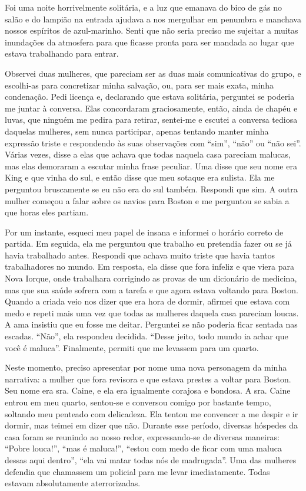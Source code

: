 Foi uma noite horrivelmente solitária, e a luz que emanava do bico de
gás no salão e do lampião na entrada ajudava a nos mergulhar em penumbra
e manchava nossos espíritos de azul-marinho. Senti que não seria preciso
me sujeitar a muitas inundações da atmosfera para que ficasse pronta
para ser mandada ao lugar que estava trabalhando para entrar.

Observei
duas mulheres, que pareciam ser as duas mais comunicativas do grupo, e
escolhi-as para concretizar minha salvação, ou, para ser mais exata,
minha condenação. Pedi licença e, declarando que estava solitária,
perguntei se poderia me juntar à conversa. Elas concordaram
graciosamente, então, ainda de chapéu e luvas, que ninguém me pedira
para retirar, sentei-me e escutei a conversa tediosa daquelas mulheres,
sem nunca participar, apenas tentando manter minha expressão triste e
respondendo às suas observações com ``sim'', ``não'' ou ``não sei''.
Várias vezes, disse a elas que achava que todas naquela casa pareciam
malucas, mas elas demoraram a escutar minha frase peculiar. Uma disse
que seu nome era King e que vinha do sul, e então disse que meu sotaque
era sulista. Ela me perguntou bruscamente se eu não era do sul também.
Respondi que sim. A outra mulher começou a falar sobre os navios para
Boston e me perguntou se sabia a que horas eles partiam.

Por um instante, esqueci meu papel de insana e informei o horário
correto de partida. Em seguida, ela me perguntou que trabalho eu
pretendia fazer ou se já havia trabalhado antes. Respondi que achava
muito triste que havia tantos trabalhadores no mundo. Em resposta, ela
disse que fora infeliz e que viera para Nova Iorque, onde trabalhara
corrigindo as provas de um dicionário de medicina, mas que sua saúde
sofrera com a tarefa e que agora estava voltando para Boston. Quando a
criada veio nos dizer que era hora de dormir, afirmei que estava com
medo e repeti mais uma vez que todas as mulheres daquela casa pareciam
loucas. A ama insistiu que eu fosse me deitar. Perguntei se não poderia
ficar sentada nas escadas. ``Não'', ela respondeu decidida. 
``Desse jeito, todo mundo ia achar que você é maluca''. Finalmente,
permiti que me levassem para um quarto.

Neste momento, preciso apresentar por nome uma nova personagem da minha
narrativa: a mulher que fora revisora e que estava prestes a voltar para
Boston. Seu nome era sra. Caine, e ela era igualmente corajosa e
bondosa. A sra. Caine entrou em meu quarto, sentou-se e conversou comigo
por bastante tempo, soltando meu penteado com delicadeza. Ela tentou me
convencer a me despir e ir dormir, mas teimei em dizer que não. Durante
esse período, diversas hóspedes da casa foram se reunindo ao nosso
redor, expressando-se de diversas maneiras: ``Pobre louca!'', ``mas é
maluca!'', ``estou com medo de ficar com uma maluca dessas aqui dentro'',
``ela vai matar todas nós de madrugada''. Uma das mulheres defendia
que chamassem um policial para me levar imediatamente. Todas estavam
absolutamente aterrorizadas.

